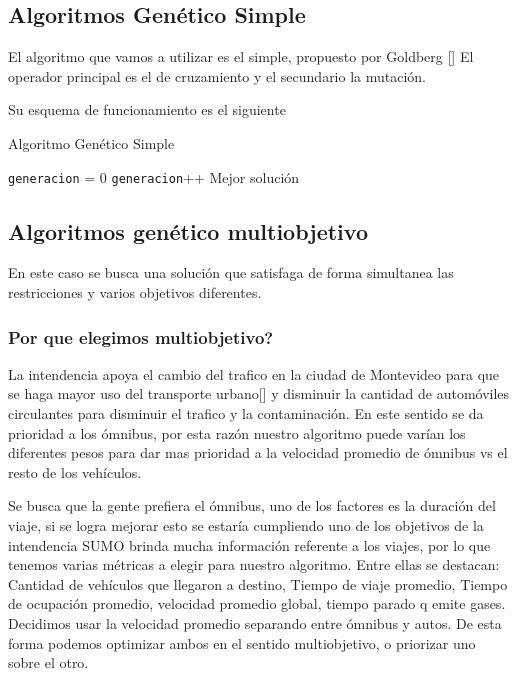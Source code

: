 \subsection{Algoritmos Genético Simple}

El algoritmo que vamos a utilizar es el simple, propuesto por Goldberg [] 
El operador principal es el de cruzamiento y el secundario la mutación.

Su esquema de funcionamiento es el siguiente


\begin{algorithm}%
	\caption{Algoritmo Genético Simple}
	\label{alg:algoritmo_genetico_simple}
	\begin{algorithmic} [1] 
		{
			\STATE \texttt{generacion} = 0
			\STATE \texttt{generacion}++
			\ENDWHILE
			\RETURN Mejor solución
		}
	\end{algorithmic}
\end{algorithm}




\subsection{Algoritmos genético multiobjetivo}



En este caso se busca una solución que satisfaga de forma simultanea las restricciones y varios objetivos diferentes.

\subsubsection{Por que elegimos multiobjetivo?}
La intendencia apoya el cambio del trafico en la ciudad de Montevideo para que se haga mayor uso del transporte urbano[] y disminuir la cantidad de automóviles circulantes para disminuir el trafico y la contaminación. En este sentido se da prioridad a los ómnibus, por esta razón nuestro algoritmo puede varían los diferentes pesos para dar mas prioridad a la velocidad promedio de ómnibus vs el resto de los vehículos.
 
Se busca que la gente prefiera el ómnibus, uno de los factores es la duración del viaje, si se logra mejorar esto se estaría cumpliendo uno de los objetivos de la intendencia
SUMO brinda mucha información referente a los viajes, por lo que tenemos varias métricas a elegir para nuestro algoritmo. Entre ellas se destacan: Cantidad de vehículos que llegaron a destino, Tiempo de viaje promedio, Tiempo de ocupación promedio, velocidad promedio global, tiempo parado q emite gases. Decidimos usar la velocidad promedio separando entre ómnibus y autos. De esta forma podemos optimizar ambos en el sentido multiobjetivo, o priorizar uno sobre el otro.


